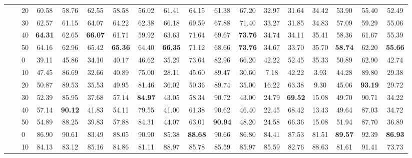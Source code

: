 \begin{table*}[!h]
{\begin{tabular}{lllccc|ccc|ccc|ccc|ccc}
 \textbf{} & \textbf{} & 20 & 60.58 & 58.76 & 62.55 & 58.58 & 56.02 & 61.41 & 64.15 & 61.38 & 67.20 & 32.97 & 31.64 & 34.42 & 53.90 & 55.40 & 52.49 \\ 
 \textbf{} & \textbf{} & 30 & 62.57 & 61.15 & 64.07 & 64.22 & 62.38 & 66.18 & 69.59 & 67.88 & 71.40 & 33.27 & 31.85 & 34.83 & 57.09 & 59.29 & 55.06 \\ 
 \textbf{} & \textbf{} & 40 & \textbf{64.31} & 62.65 & \textbf{66.07} & 61.71 & 59.92 & 63.63 & 71.64 & 69.67 & \textbf{73.76} & 34.74 & 34.11 & 35.41 & 58.36 & 61.67 & 55.39 \\ 
 \textbf{} & \textbf{} & 50 & 64.16 & 62.96 & 65.42 & \textbf{65.36} & 64.40 & \textbf{66.35} & 71.12 & 68.66 & \textbf{73.76} & 34.67 & 33.70 & 35.70 & \textbf{58.74} & 62.20 & \textbf{55.66} \\ 
 \arrayrulecolor{gray}\cline{2-18}\arrayrulecolor{black}
\textbf{} & \textbf{\multirow{6}{*}{SC}} & 0 & 39.11 & 45.86 & 34.10 & 40.17 & 46.62 & 35.29 & 73.64 & 82.96 & 66.20 & 42.22 & 52.45 & 35.33 & 50.89 & 62.90 & 42.74 \\ 
 \textbf{} & \textbf{} & 10 & 47.45 & 86.69 & 32.66 & 40.89 & 75.00 & 28.11 & 45.60 & 89.47 & 30.60 & 7.18 & 42.22 & 3.93 & 44.28 & 89.80 & 29.38 \\ 
 \textbf{} & \textbf{} & 20 & 50.87 & 89.53 & 35.53 & 49.95 & 81.46 & 36.02 & 50.36 & 89.74 & 35.00 & 16.22 & 63.38 & 9.30 & 45.06 & \textbf{93.19} & 29.72 \\ 
 \textbf{} & \textbf{} & 30 & 52.39 & 85.95 & 37.68 & 57.14 & \textbf{84.97} & 43.05 & 58.34 & 90.72 & 43.00 & 24.79 & \textbf{69.52} & 15.08 & 49.70 & 90.71 & 34.22 \\ 
 \textbf{} & \textbf{} & 40 & 57.14 & \textbf{90.12} & 41.83 & 54.11 & 79.55 & 41.00 & 61.38 & 90.62 & 46.40 & 22.45 & 68.42 & 13.43 & 49.64 & 87.03 & 34.72 \\ 
 \textbf{} & \textbf{} & 50 & 54.89 & 88.25 & 39.83 & 57.88 & 84.31 & 44.07 & 63.01 & \textbf{90.94} & 48.20 & 24.58 & 66.36 & 15.08 & 51.94 & 87.70 & 36.89 \\ 
\hline
\arrayrulecolor{gray}\cline{2-18}\arrayrulecolor{black}
\textbf{\multirow{12}{*}{Sentiment Polarity}} & \textbf{\multirow{6}{*}{-}} & 0 & 86.90 & 90.61 & 83.49 & 88.05 & 90.90 & 85.38 & \textbf{88.68} & 90.66 & 86.80 & 84.41 & 87.53 & 81.51 & \textbf{89.57} & 92.39 & \textbf{86.93} \\ 
 \textbf{} & \textbf{} & 10 & 84.13 & 83.12 & 85.16 & 84.86 & 81.11 & 88.97 & 85.78 & 85.59 & 85.97 & 85.59 & 82.76 & 88.63 & 81.61 & 91.41 & 73.73 \\ 

\end{tabular}}
\end{table*}
